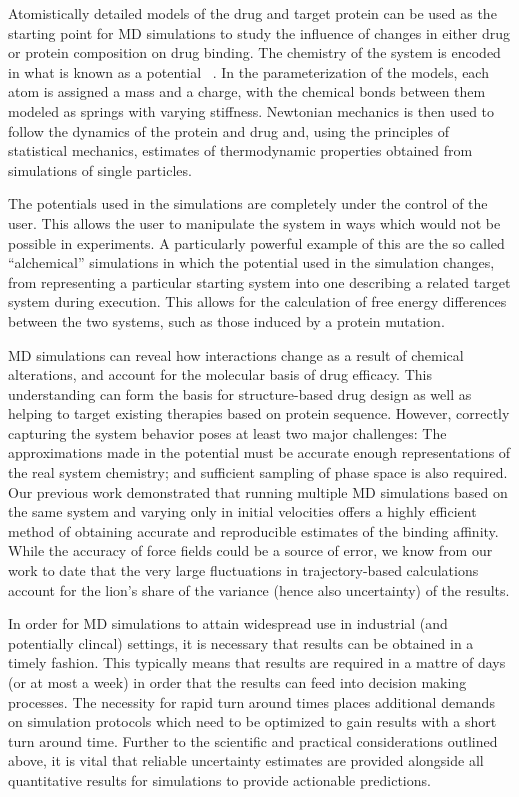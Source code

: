 Atomistically detailed models of the drug and target protein can be used as the
starting point for MD simulations to study the influence of changes in 
either drug or protein composition on drug binding. 
The chemistry of the system is encoded in what is known as a potential
~\cite{Karplus2002}. 
In the parameterization of the models, each atom is assigned a mass and a charge,
with the chemical bonds between them modeled as springs with varying
stiffness.
Newtonian mechanics is then used to follow the dynamics of the protein and drug and, 
using the principles of statistical mechanics, estimates of thermodynamic properties 
obtained from simulations of single particles.

The potentials used in the simulations are completely under the control of
the user. 
This allows the user to manipulate the system in ways which would
not be possible in experiments. 
A particularly powerful example of this are
the so called ``alchemical'' simulations in which the potential used in the
simulation changes, from representing a particular starting system into one 
describing a related target system during execution. 
This allows for the calculation of free energy differences between the two 
systems, such as those induced by a protein mutation.

MD simulations can reveal how interactions change as a result of chemical alterations,
and account for the molecular basis of drug efficacy. 
This understanding can form the basis for structure-based drug design as well as helping 
to target existing therapies based on protein sequence. 
However, correctly capturing the system behavior poses at least two major 
challenges: The approximations made in the potential must be accurate enough representations 
of the real system chemistry; and sufficient sampling of phase space is also required.
Our previous work demonstrated \cite{Sadiq2010, Wan2011} that running multiple 
MD simulations based on the same system and varying only in initial velocities
offers a highly efficient method of obtaining accurate and reproducible
estimates of the binding affinity.
While the accuracy of force fields could be a source of error, we know from our work to 
date that the very large fluctuations in trajectory-based calculations account for the lion’s 
share of the variance (hence also uncertainty) of the results.

In order for MD simulations to attain widespread use in industrial (and potentially 
clincal) settings, it is necessary that results can be obtained in a timely fashion.
This typically means that results are required in a mattre of days (or at most a week) 
in order that the results can feed into decision making processes.
The necessity for rapid turn around times places additional demands on
simulation protocols which need to be optimized to gain results with a short
turn around time. 
Further to the scientific and practical considerations
outlined above, it is vital that reliable uncertainty estimates are
provided alongside all quantitative results for simulations to provide
actionable predictions.

